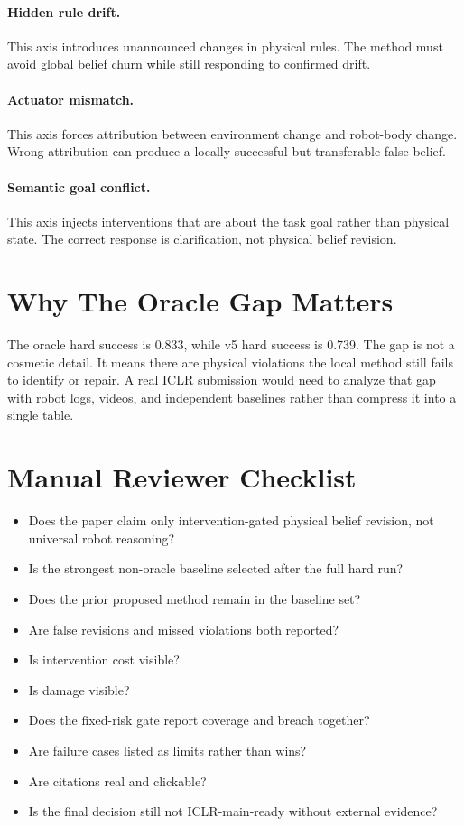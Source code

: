 \documentclass{article}
\begin{document}
\paragraph{Hidden rule drift.} This axis introduces unannounced changes in physical rules. The method must avoid global belief churn while still responding to confirmed drift.

\paragraph{Actuator mismatch.} This axis forces attribution between environment change and robot-body change. Wrong attribution can produce a locally successful but transferable-false belief.

\paragraph{Semantic goal conflict.} This axis injects interventions that are about the task goal rather than physical state. The correct response is clarification, not physical belief revision.

\section{Why The Oracle Gap Matters}
The oracle hard success is 0.833, while v5 hard success is 0.739. The gap is not a cosmetic detail. It means there are physical violations the local method still fails to identify or repair. A real ICLR submission would need to analyze that gap with robot logs, videos, and independent baselines rather than compress it into a single table.

\clearpage
\section{Manual Reviewer Checklist}
\begin{itemize}
\item Does the paper claim only intervention-gated physical belief revision, not universal robot reasoning?
\item Is the strongest non-oracle baseline selected after the full hard run?
\item Does the prior proposed method remain in the baseline set?
\item Are false revisions and missed violations both reported?
\item Is intervention cost visible?
\item Is damage visible?
\item Does the fixed-risk gate report coverage and breach together?
\item Are failure cases listed as limits rather than wins?
\item Are citations real and clickable?
\item Is the final decision still not ICLR-main-ready without external evidence?
\end{itemize}
\end{document}

